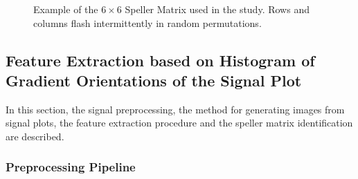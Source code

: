 \documentclass[entropy,article,submit,moreauthors,pdftex,10pt,a4paper]{mdpi}
\begin{document}
\begin{figure}[H]
\centering
{}
\caption{Example of the $6 \times 6$ Speller Matrix used in the study.  Rows and columns flash intermittently in random permutations.}
\label{fig:p300matrix}
\end{figure}

\subsection{Feature Extraction based on Histogram of Gradient Orientations of the Signal Plot} \label{Feature}

In this section, the signal preprocessing, the method for generating images from signal plots, the feature extraction procedure and the speller matrix identification are described. 

\subsubsection{Preprocessing Pipeline} \label{Pipeline}
\end{document}
